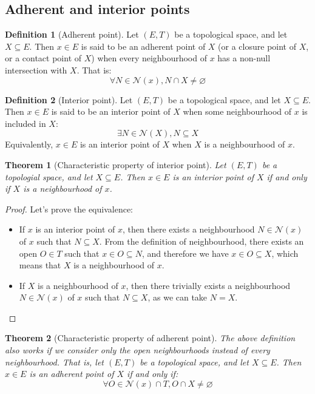 \documentclass{article}
\newtheorem{theorem}{Theorem}[section]
\theoremstyle{definition}
\newtheorem{definition}{Definition}[section]
\theoremstyle{remark}
\theoremstyle{example}
\theoremstyle{notation}
\begin{document}
\subsection{Adherent and interior points}

\begin{definition}[Adherent point] %
		Let $(E, T)$ be a topological space, and let $X \subseteq E$. Then $x \in E$ is said to be an adherent point of $X$ (or a closure point of $X$, or a contact point of $X$) when every neighbourhood of $x$ has a non-null intersection with $X$. That is:
				$$\forall N \in \mathcal{N}(x), N \cap X \neq \varnothing$$
\end{definition}

\begin{definition}[Interior point]
		Let $(E, T)$ be a topological space, and let $X \subseteq E$. Then $x \in E$ is said to be an interior point of $X$ when some neighbourhood of $x$ is included in $X$:
				$$\exists N \in \mathcal{N}(X), N \subseteq X$$
		Equivalently, $x \in E$ is an interior point of $X$ when $X$ is a neighbourhood of $x$.
\end{definition}

\begin{theorem}[Characteristic property of interior point]
		Let $(E, T)$ be a topologial space, and let $X \subseteq E$. Then $x \in E$ is an interior point of $X$ if and only if $X$ is a neighbourhood of $x$.
\end{theorem}

\begin{proof}
		Let's prove the equivalence:
		\begin{itemize}
				\item If $x$ is an interior point of $x$, then there exists a neighbourhood $N \in \mathcal{N}(x)$ of $x$ such that $N \subseteq X$. From the definition of neighbourhood, there exists an open $O \in T$ such that $x \in O \subseteq N$, and therefore we have $x \in O \subseteq X$, which means that $X$ is a neighbourhood of $x$.
				\item If $X$ is a neighbourhood of $x$, then there trivially exists a neighbourhood $N \in \mathcal{N}(x)$ of $x$ such that $N \subseteq X$, as we can take $N = X$.
		\end{itemize}
\end{proof}

\begin{theorem}[Characteristic property of adherent point] \label{thm:adherent-carac}
		The above definition also works if we consider only the open neighbourhoods instead of every neighbourhood. That is, let $(E, T)$ be a topological space, and let $X \subseteq E$. Then $x \in E$ is an adherent point of $X$ if and only if:
				$$\forall O \in \mathcal{N}(x) \cap T, O \cap X \neq \varnothing$$
\end{theorem}
\end{document}
